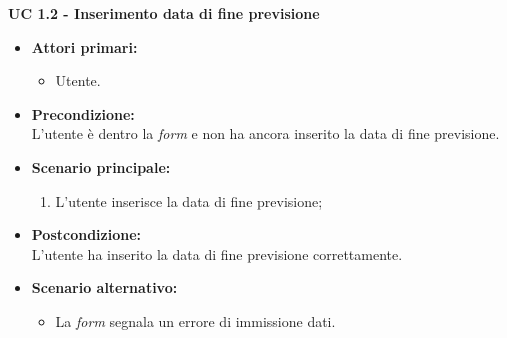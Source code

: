 \vspace{0.5cm}

\noindent \textbf{\large UC 1.2 - Inserimento data di fine previsione}
\label{uc:inserimento-data-fine-prev}
\begin{itemize}

	\item \textbf{Attori primari: }
		\begin{itemize}
			\item Utente.
		\end{itemize}

	\item \textbf{Precondizione: }\\[0.3cm]
		L'utente è dentro la \textit{form} e non ha ancora inserito la data di fine previsione.

	\item \textbf{Scenario principale: }
		\begin{enumerate}
			\item L'utente inserisce la data di fine previsione;
		\end{enumerate}

	\item \textbf{Postcondizione: }\\[0.3cm]
		L'utente ha inserito la data di fine previsione correttamente.

	\item \textbf{Scenario alternativo: }
		\begin{itemize}
		    \item La \textit{form} segnala un errore di immissione dati.
		\end{itemize}

\end{itemize}

\vspace{0.5cm}

